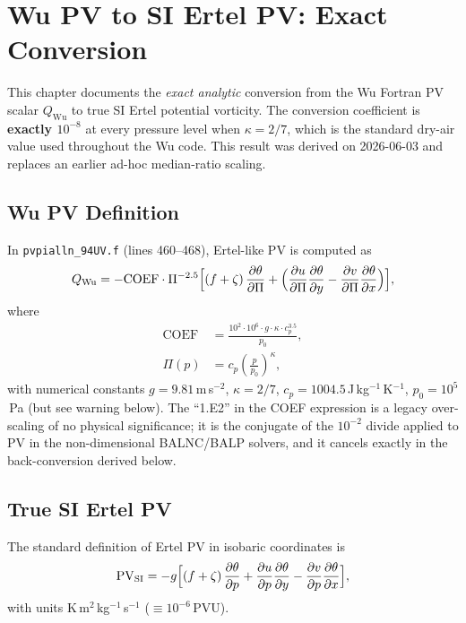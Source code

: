 \chapter{Wu PV to SI Ertel PV: Exact Conversion}
\label{chap:wu_coeffs}

This chapter documents the \emph{exact analytic} conversion from the
Wu Fortran PV scalar $Q_{\text{Wu}}$ to true SI Ertel potential
vorticity.  The conversion coefficient is \textbf{exactly $10^{-8}$}
at every pressure level when $\kappa = 2/7$, which is the standard
dry-air value used throughout the Wu code.  This result was derived on
2026-06-03 and replaces an earlier ad-hoc median-ratio scaling.

\section{Wu PV Definition}

In \texttt{pvpialln\_94UV.f} (lines 460--468), Ertel-like PV is
computed as
\begin{equation}
Q_{\text{Wu}} = -\mathrm{COEF}\cdot\Pi^{-2.5}
  \Bigl[(f+\zeta)\,\frac{\partial\theta}{\partial\Pi}
        + \Bigl(\frac{\partial u}{\partial\Pi}\frac{\partial\theta}{\partial y}
                - \frac{\partial v}{\partial\Pi}\frac{\partial\theta}{\partial x}\Bigr)
  \Bigr],
\label{eq:wu_q}
\end{equation}
where
\begin{align}
\mathrm{COEF} &= \frac{10^{2}\cdot10^{6}\cdot g\cdot\kappa\cdot c_p^{3.5}}{p_0},
\label{eq:coef} \\
\Pi(p) &= c_p\left(\frac{p}{p_0}\right)^{\kappa},
\label{eq:pi_wu}
\end{align}
with numerical constants $g=9.81$\,m\,s$^{-2}$,
$\kappa = 2/7$, $c_p=1004.5$\,J\,kg$^{-1}$\,K$^{-1}$,
$p_0 = 10^{5}$\,Pa (but see warning below).  The ``1.E2'' in the
COEF expression is a legacy over-scaling of no physical significance;
it is the conjugate of the $10^{-2}$ divide applied to PV in the
non-dimensional BALNC/BALP solvers, and it cancels exactly in the
back-conversion derived below.

\section{True SI Ertel PV}

The standard definition of Ertel PV in isobaric coordinates is
\begin{equation}
\mathrm{PV}_{\text{SI}} = -g
  \Bigl[(f+\zeta)\,\frac{\partial\theta}{\partial p}
        + \frac{\partial u}{\partial p}\frac{\partial\theta}{\partial y}
        - \frac{\partial v}{\partial p}\frac{\partial\theta}{\partial x}
  \Bigr],
\label{eq:pv_si}
\end{equation}
with units K\,m$^{2}$\,kg$^{-1}$\,s$^{-1}$
($\equiv 10^{-6}$\,PVU).

